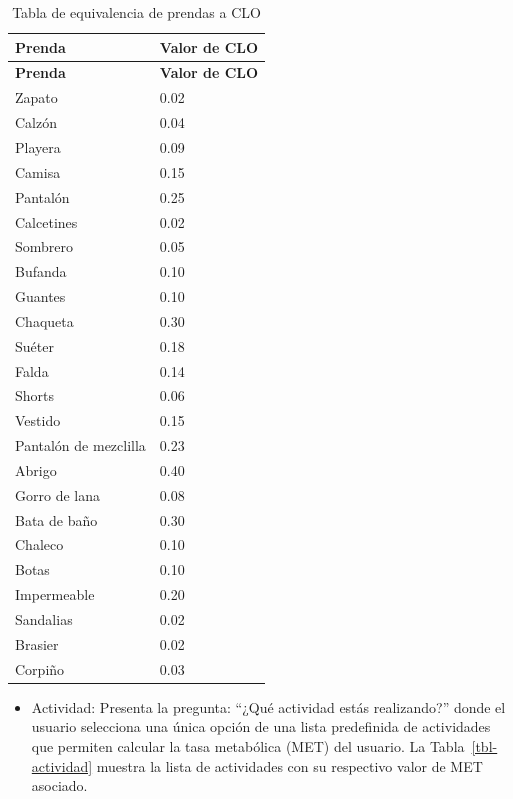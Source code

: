 \documentclass[
  letterpaper,
  DIV=11,
  numbers=noendperiod]{scrreport}
\providecommand{\tightlist}{%
  \setlength{\itemsep}{0pt}\setlength{\parskip}{0pt}}\usepackage{longtable,booktabs,array}
\begin{document}
\hypertarget{tbl-prendas}{}
\begin{longtable}[]{@{}ll@{}}
\caption{\label{tbl-prendas}Tabla de equivalencia de prendas a
CLO}\tabularnewline
\toprule\noalign{}
\textbf{Prenda} & \textbf{Valor de CLO} \\
\midrule\noalign{}
\endfirsthead
\toprule\noalign{}
\textbf{Prenda} & \textbf{Valor de CLO} \\
\midrule\noalign{}
\endhead
\bottomrule\noalign{}
\endlastfoot
Zapato & 0.02 \\
Calzón & 0.04 \\
Playera & 0.09 \\
Camisa & 0.15 \\
Pantalón & 0.25 \\
Calcetines & 0.02 \\
Sombrero & 0.05 \\
Bufanda & 0.10 \\
Guantes & 0.10 \\
Chaqueta & 0.30 \\
Suéter & 0.18 \\
Falda & 0.14 \\
Shorts & 0.06 \\
Vestido & 0.15 \\
Pantalón de mezclilla & 0.23 \\
Abrigo & 0.40 \\
Gorro de lana & 0.08 \\
Bata de baño & 0.30 \\
Chaleco & 0.10 \\
Botas & 0.10 \\
Impermeable & 0.20 \\
Sandalias & 0.02 \\
Brasier & 0.02 \\
Corpiño & 0.03 \\
\end{longtable}

\begin{itemize}
\tightlist
\item
  Actividad: Presenta la pregunta: ``¿Qué actividad estás realizando?''
  donde el usuario selecciona una única opción de una lista predefinida
  de actividades que permiten calcular la tasa metabólica (MET) del
  usuario. La Tabla~\ref{tbl-actividad} muestra la lista de actividades
  con su respectivo valor de MET asociado.
\end{itemize}
\end{document}
